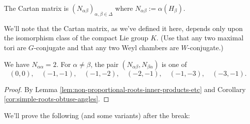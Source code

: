 \documentclass[reqno]{amsart} 
\begin{document}
\begin{definition}
  The Cartan matrix is $(N_{\alpha \beta})_{\alpha, \beta \in \Delta}$ where $N_{\alpha \beta} := \alpha(H_\beta)$.
\end{definition}

We'll note that the Cartan matrix, as we've defined it here, depends only upon the isomorphism class of the compact Lie group $K$.  (Use that any two maximal tori are $G$-conjugate and that any two Weyl chambers are $W$-conjugate.)

\begin{lemma}
  We have $N_{\alpha \alpha} = 2$.  For $\alpha \neq \beta$, the pair $(N_{\alpha \beta},N_{\beta \alpha})$ is one of
  \begin{equation*}
    (0,0), \quad (-1,-1), \quad (-1,-2), \quad (-2,-1), \quad (-1,-3), \quad (-3,-1).
  \end{equation*}
\end{lemma}
\begin{proof}
  By Lemma \ref{lem:non-proportional-roots-inner-products-etc} and Corollary \ref{cor:simple-roots-obtuse-angles}.
\end{proof}


We'll prove the following (and some variants) after the break:
\end{document}
